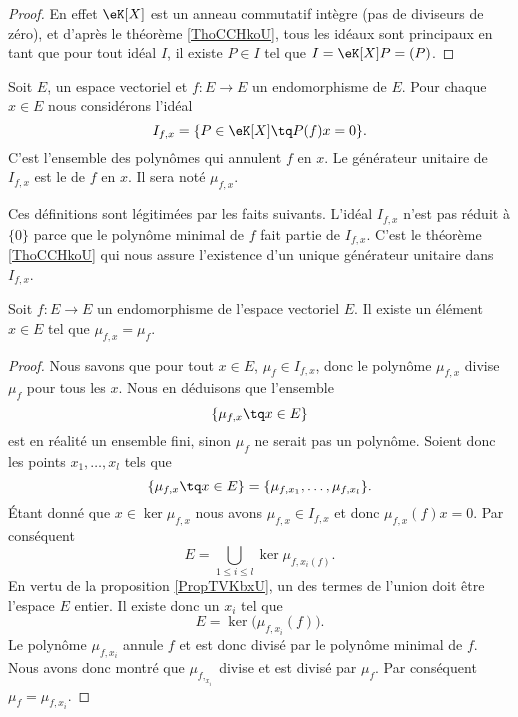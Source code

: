 \begin{proof}
    En effet \( \eK[X]\) est un anneau commutatif intègre (pas de diviseurs de zéro), et d'après le théorème \ref{ThoCCHkoU}, tous les idéaux sont principaux en tant que pour tout idéal \( I\), il existe \( P\in I\) tel que \( I=\eK[X]P=(P)\).
\end{proof}

\begin{definition}  \label{Decyyumy}
    Soit \( E\), un espace vectoriel et \( f\colon E\to E\) un endomorphisme de \( E\). Pour chaque \( x\in E\) nous considérons l'idéal
    \begin{equation}
        I_{f,x}=\{ P\in \eK[X]\tq P(f)x=0 \}.
    \end{equation}
    C'est l'ensemble des polynômes qui annulent \( f\) en \( x\). Le générateur unitaire de \( I_{f,x}\) est le  de \( f\) en \( x\). Il sera noté \( \mu_{f,x}\).
\end{definition}
Ces définitions sont légitimées par les faits suivants. L'idéal \( I_{f,x}\) n'est pas réduit à \( \{ 0 \}\) parce que le polynôme minimal de \( f\) fait partie de \( I_{f,x}\). C'est le théorème \ref{ThoCCHkoU} qui nous assure l'existence d'un unique générateur unitaire dans~\( I_{f,x}\). 

\begin{lemma}\label{LemSYsJJj}
    Soit \( f\colon E\to E\) un endomorphisme de l'espace vectoriel \( E\). Il existe un élément \( x\in E\) tel que \( \mu_{f,x}=\mu_f\).
\end{lemma}

\begin{proof}
    Nous savons que pour tout \( x\in E\), \( \mu_f\in I_{f,x}\), donc le polynôme \( \mu_{f,x}\) divise \( \mu_f\) pour tous les \( x\). Nous en déduisons que l'ensemble
    \begin{equation}
        \{ \mu_{f,x}\tq x\in E \}
    \end{equation}
    est en réalité un ensemble fini, sinon \( \mu_f\) ne serait pas un polynôme. Soient donc les points \( x_1,\ldots, x_l\) tels que
    \begin{equation}
        \{ \mu_{f,x}\tq x\in E \}=\{ \mu_{f,x_1},\ldots, \mu_{f,x_l} \}.
    \end{equation}
    Étant donné que \( x\in \ker\mu_{f,x}\) nous avons \( \mu_{f,x}\in I_{f,x}\) et donc \( \mu_{f,x}(f)x=0\). Par conséquent
    \begin{equation}
        E=\bigcup_{1\leq i\leq l}\ker\mu_{f,x_i(f)}.
    \end{equation}
    En vertu de la proposition \ref{PropTVKbxU}, un des termes de l'union doit être l'espace \( E\) entier. Il existe donc un \( x_i\) tel que
    \begin{equation}
        E=\ker\big( \mu_{f,x_i}(f) \big).
    \end{equation}
    Le polynôme \( \mu_{f,x_i}\) annule \( f\) et est donc divisé par le polynôme minimal de \( f\). Nous avons donc montré que \( \mu_{f,_{x_i}}\) divise et est divisé par \( \mu_f\). Par conséquent \( \mu_f=\mu_{f,x_i}\).
\end{proof}

